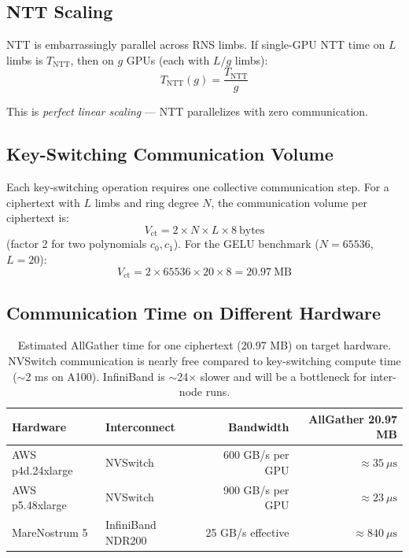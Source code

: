 \documentclass[11pt,letterpaper]{article}
\begin{document}
\subsection{NTT Scaling}

NTT is embarrassingly parallel across RNS limbs. If single-GPU NTT time on $L$ limbs is
$T_\text{NTT}$, then on $g$ GPUs (each with $L/g$ limbs):
\[
T_\text{NTT}(g) = \frac{T_\text{NTT}}{g}
\]

This is \emph{perfect linear scaling} --- NTT parallelizes with zero communication.

\subsection{Key-Switching Communication Volume}

Each key-switching operation requires one collective communication step. For a ciphertext
with $L$ limbs and ring degree $N$, the communication volume per ciphertext is:
\[
V_\text{ct} = 2 \times N \times L \times 8\ \text{bytes}
\]
(factor 2 for two polynomials $c_0, c_1$). For the GELU benchmark ($N=65536$, $L=20$):
\[
V_\text{ct} = 2 \times 65536 \times 20 \times 8 = 20.97\ \text{MB}
\]

\subsection{Communication Time on Different Hardware}

\begin{table}[h]
\centering
\begin{tabular}{@{}llrr@{}}
\toprule
\textbf{Hardware} & \textbf{Interconnect} & \textbf{Bandwidth} & \textbf{AllGather 20.97 MB} \\
\midrule
AWS p4d.24xlarge   & NVSwitch             & 600 GB/s per GPU   & $\approx 35\ \mu\text{s}$ \\
AWS p5.48xlarge    & NVSwitch             & 900 GB/s per GPU   & $\approx 23\ \mu\text{s}$ \\
MareNostrum 5      & InfiniBand NDR200    & 25 GB/s effective  & $\approx 840\ \mu\text{s}$ \\
\bottomrule
\end{tabular}
\caption{Estimated AllGather time for one ciphertext (20.97 MB) on target hardware.
NVSwitch communication is nearly free compared to key-switching compute time ($\sim$2 ms on
A100). InfiniBand is $\sim$24$\times$ slower and will be a bottleneck for inter-node runs.}
\label{tab:commtime}
\end{table}
\end{document}
